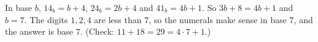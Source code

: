 In base $b$, $14_b=b+4$, $24_b=2b+4$ and $41_b=4b+1$. So $3b+8=4b+1$ and $b=7$. The digits $1,2,4$ are less than $7$, so the numerals make sense in base $7$, and the answer is base $\boxed{7}$. (Check: $11+18=29=4\cdot7+1$.)
